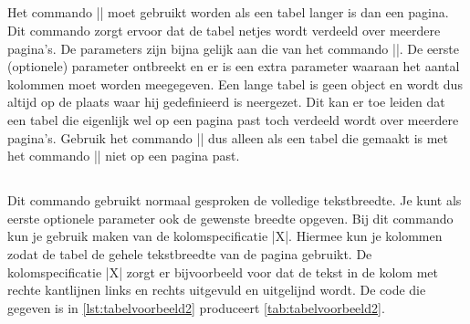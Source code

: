 \begin{llstShortInline}
	\subsection{\texorpdfstring{\lcode{\\langetabel}}{\textbackslash{}langetabel}}
	Het commando |\langetabel| moet gebruikt worden als een tabel langer is dan een pagina.
	Dit commando zorgt ervoor dat de tabel netjes wordt verdeeld over meerdere pagina's.
	De parameters zijn bijna gelijk aan die van het commando |\tabel|.
	De eerste (optionele) parameter ontbreekt en er is een extra parameter waaraan het aantal kolommen moet worden meegegeven.
	Een lange tabel is geen  object en wordt dus altijd op de plaats waar hij gedefinieerd is neergezet.
	Dit kan er toe leiden dat een tabel die eigenlijk wel op een pagina past toch verdeeld wordt over meerdere pagina's.
	Gebruik het commando |\langetabel| dus alleen als een tabel die gemaakt is met het commando |\tabel| niet op een pagina past.
	
	\subsection{\texorpdfstring{\lcode{\\tabelX}}{\textbackslash{}tabelX}}
	Dit commando gebruikt normaal gesproken de volledige tekstbreedte.
	Je kunt als eerste optionele parameter ook de gewenste breedte opgeven.
	Bij dit commando kun je gebruik maken van de kolomspecificatie |X|. 
	Hiermee kun je kolommen  zodat de tabel de gehele tekstbreedte van de pagina gebruikt.
	De kolomspecificatie |X| zorgt er bijvoorbeeld voor dat de tekst in de kolom met rechte kantlijnen links en rechts uitgevuld en uitgelijnd wordt.
	De code die gegeven is in \cref{lst:tabelvoorbeeld2} produceert \cref{tab:tabelvoorbeeld2}.
	


\end{llstShortInline}
